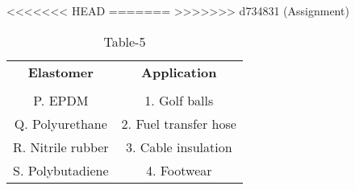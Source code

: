 \begin{table}[htbp]
  \centering
  \caption{Table-5}
<<<<<<< HEAD
  \label{tab:tables/table5.tex}
=======
  \label{table5}
>>>>>>> d734831 (Assignment)
  \begin{tabular}{cc}
  \textbf{Elastomer} & \textbf{Application} \\ \\
    P. EPDM & 1. Golf balls \\
    Q. Polyurethane & 2. Fuel transfer hose \\
    R. Nitrile rubber & 3. Cable insulation \\
    S. Polybutadiene & 4. Footwear \\
  \end{tabular}
\end{table}